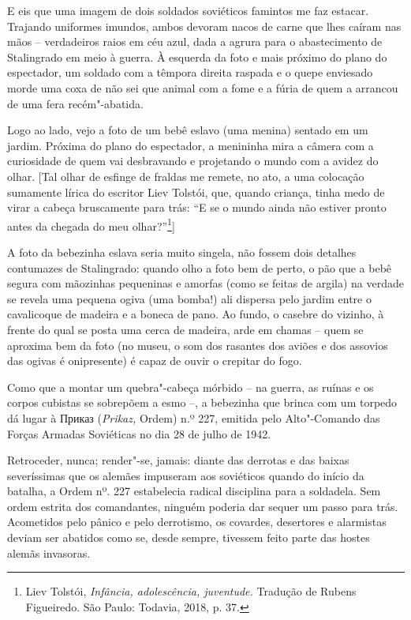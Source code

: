 E eis que uma imagem de dois soldados soviéticos famintos me faz
estacar. Trajando uniformes imundos, ambos devoram nacos de carne que
lhes caíram nas mãos -- verdadeiros raios em céu azul, dada a agrura
para o abastecimento de Stalingrado em meio à guerra. À esquerda da foto
e mais próximo do plano do espectador, um soldado com a têmpora direita
raspada e o quepe enviesado morde uma coxa de não sei que animal com a
fome e a fúria de quem a arrancou de uma fera recém"-abatida.

Logo ao lado, vejo a foto de um bebê eslavo (uma menina) sentado em um
jardim. Próxima do plano do espectador, a menininha mira a câmera com a
curiosidade de quem vai desbravando e projetando o mundo com a avidez do
olhar. {[}Tal olhar de esfinge de fraldas me remete, no ato, a uma
colocação sumamente lírica do escritor Liev Tolstói, que, quando
criança, tinha medo de virar a cabeça bruscamente para trás: ``E se o
mundo ainda não estiver pronto antes da chegada do meu
olhar?''\footnote{Liev Tolstói, \emph{Infância, adolescência,
  juventude.} Tradução de Rubens Figueiredo. São Paulo: Todavia, 2018,
  p. 37.}{]}

A foto da bebezinha eslava seria muito singela, não fossem dois detalhes
contumazes de Stalingrado: quando olho a foto bem de perto, o pão que a
bebê segura com mãozinhas pequeninas e amorfas (como se feitas de
argila) na verdade se revela uma pequena ogiva (uma bomba!) ali dispersa
pelo jardim entre o cavalicoque de madeira e a boneca de pano. Ao fundo,
o casebre do vizinho, à frente do qual se posta uma cerca de madeira,
arde em chamas -- quem se aproxima bem da foto (no museu, o som dos
rasantes dos aviões e dos assovios das ogivas é onipresente) é capaz de
ouvir o crepitar do fogo.

Como que a montar um quebra"-cabeça mórbido -- na guerra, as ruínas e os
corpos cubistas se sobrepõem a esmo --, a bebezinha que brinca com um
torpedo dá lugar à Приказ (\emph{Prikaz,} Ordem) n.º 227, emitida pelo Alto"-Comando das Forças Armadas Soviéticas no dia 28 de julho de 1942.

Retroceder, nunca; render"-se, jamais: diante das derrotas e das baixas
severíssimas que os alemães impuseram aos soviéticos quando do início da
batalha, a Ordem nº. 227 estabelecia radical disciplina para a
soldadela. Sem ordem estrita dos comandantes, ninguém poderia dar sequer
um passo para trás. Acometidos pelo pânico e pelo derrotismo, os
covardes, desertores e alarmistas deviam ser abatidos como se, desde
sempre, tivessem feito parte das hostes alemãs invasoras.

